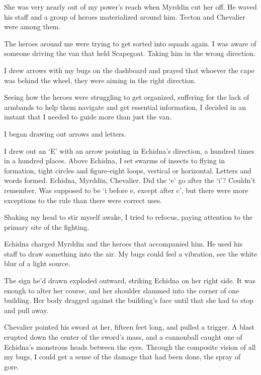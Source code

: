 She was very nearly out of my power's reach when Myrddin cut her off.  He waved his staff and a group of heroes materialized around him.  Tecton and Chevalier were among them.



The heroes around me were trying to get sorted into squads again.  I was aware of someone driving the van that held Scapegoat.  Taking him in the wrong direction.



I drew arrows with my bugs on the dashboard and prayed that whoever the cape was behind the wheel, they were aiming in the right direction.



Seeing how the heroes were struggling to get organized, suffering for the lack of armbands to help them navigate and get essential information, I decided in an instant that I needed to guide more than just the van.



I began drawing out arrows and letters.



I drew out an `E' with an arrow pointing in Echidna's direction, a hundred times in a hundred places.  Above Echidna, I set swarms of insects to flying in formation, tight circles and figure-eight loops, vertical or horizontal.  Letters and words formed.  Echidna, Myrddin, Chevalier.  Did the `e' go after the `i'?  Couldn't remember.  Was supposed to be `i before e, except after c', but there were more exceptions to the rule than there were correct uses.



Shaking my head to stir myself awake, I tried to refocus, paying attention to the primary site of the fighting.



Echidna charged Myrddin and the heroes that accompanied him.  He used his staff to draw something into the air.  My bugs could feel a vibration, see the white blur of a light source.



The sign he'd drawn exploded outward, striking Echidna on her right side.  It was enough to alter her course, and her shoulder slammed into the corner of one building.  Her body dragged against the building's face until that she had to stop and pull away.



Chevalier pointed his sword at her, fifteen feet long, and pulled a trigger.  A blast erupted down the center of the sword's mass, and a cannonball caught one of Echidna's monstrous heads between the eyes.  Through the composite vision of all my bugs, I could get a sense of the damage that had been done, the spray of gore.



